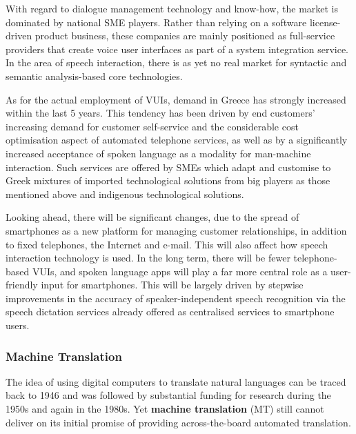 \begin{multicols}{2}
With regard to dialogue management technology and know-how, the market is dominated by national SME players. Rather than relying on a software license-driven product business, these companies are mainly positioned as full-service providers that create voice user interfaces as part of a system integration service. In the area of speech interaction, there is as yet no real market for syntactic and semantic analysis-based core technologies.

As for the actual employment of VUIs, demand in Greece has strongly increased within the last 5 years. This tendency has been driven by end customers’ increasing demand for customer self-service and the considerable cost optimisation aspect of automated telephone services, as well as by a significantly increased acceptance of spoken language as a modality for man-machine interaction. Such services are offered by SMEs which adapt and customise to Greek mixtures of imported technological solutions from big players as those mentioned above and indigenous technological solutions.

Looking ahead, there will be significant changes, due to the spread of smartphones as a new platform for managing customer relationships, in addition to fixed telephones, the Internet and e-mail. This will also affect how speech interaction technology is used. In the long term, there will be fewer telephone-based VUIs, and spoken language apps will play a far more central role as a user-friendly input for smartphones. This will be largely driven by stepwise improvements in the accuracy of speaker-independent speech recognition via the speech dictation services already offered as centralised services to smartphone users.

\subsubsection{Machine Translation}

The idea of using digital computers to translate natural languages can be traced back to 1946 and was followed by substantial funding for research during the 1950s and again in the 1980s. Yet \textbf{machine translation} (MT) still cannot deliver on its initial promise of providing across-the-board automated translation.



\end{multicols}
